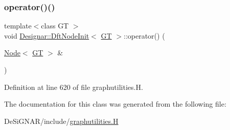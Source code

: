 \subsubsection{\texorpdfstring{operator()()}{operator()()}}
{\footnotesize\ttfamily template$<$class GT $>$ \\
void \hyperlink{class_designar_1_1_dft_node_init}{Designar\+::\+Dft\+Node\+Init}$<$ \hyperlink{demo-buildgraph_8_c_a3001c40d2c31ca87ed96cd7d1334a55e}{GT} $>$\+::operator() (\begin{DoxyParamCaption}\item[{\hyperlink{namespace_designar_a5af326c65aa2bd26b26c410f2030d09e}{Node}$<$ \hyperlink{demo-buildgraph_8_c_a3001c40d2c31ca87ed96cd7d1334a55e}{GT} $>$ \&}]{ }\end{DoxyParamCaption})\hspace{0.3cm}{\ttfamily [inline]}}



Definition at line 620 of file graphutilities.\+H.



The documentation for this class was generated from the following file\+:\begin{DoxyCompactItemize}
\item 
De\+Si\+G\+N\+A\+R/include/\hyperlink{graphutilities_8_h}{graphutilities.\+H}\end{DoxyCompactItemize}
